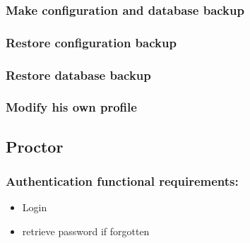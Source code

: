 \documentclass[a4paper,12p]{article}
\begin{document}
     \subsubsection{Make configuration and database backup}
     \subsubsection{Restore configuration backup}
     \subsubsection{Restore database backup}
     \subsubsection{Modify his own profile}

     \subsection{Proctor }
     \subsubsection{Authentication functional requirements:}
     \begin{itemize}
         \item Login
         \item retrieve password if forgotten
     \end{itemize}
\end{document}
